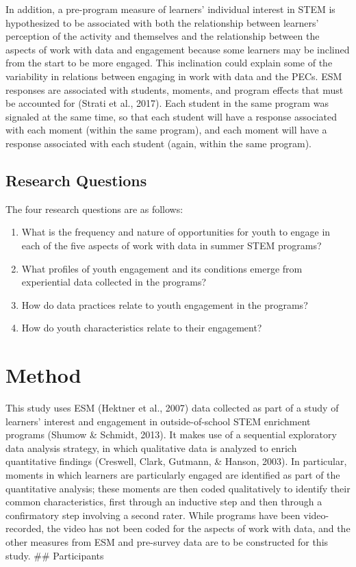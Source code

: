 \documentclass[]{msu-thesis}
\providecommand{\tightlist}{%
  \setlength{\itemsep}{0pt}\setlength{\parskip}{0pt}}
\theoremstyle{definition}
\theoremstyle{definition}
\theoremstyle{definition}
\theoremstyle{remark}
\begin{document}
In addition, a pre-program measure of learners' individual interest in
STEM is hypothesized to be associated with both the relationship between
learners' perception of the activity and themselves and the relationship
between the aspects of work with data and engagement because some
learners may be inclined from the start to be more engaged. This
inclination could explain some of the variability in relations between
engaging in work with data and the PECs. ESM responses are associated
with students, moments, and program effects that must be accounted for
(Strati et al., 2017). Each student in the same program was signaled at
the same time, so that each student will have a response associated with
each moment (within the same program), and each moment will have a
response associated with each student (again, within the same program).

\section{Research Questions}\label{research-questions}

The four research questions are as follows:

\begin{enumerate}
\def\labelenumi{\arabic{enumi}.}
\tightlist
\item
  What is the frequency and nature of opportunities for youth to engage
  in each of the five aspects of work with data in summer STEM programs?
\item
  What profiles of youth engagement and its conditions emerge from
  experiential data collected in the programs?
\item
  How do data practices relate to youth engagement in the programs?
\item
  How do youth characteristics relate to their engagement?
\end{enumerate}

\chapter{Method}\label{method}

This study uses ESM (Hektner et al., 2007) data collected as part of a
study of learners' interest and engagement in outside-of-school STEM
enrichment programs (Shumow \& Schmidt, 2013). It makes use of a
sequential exploratory data analysis strategy, in which qualitative data
is analyzed to enrich quantitative findings (Creswell, Clark, Gutmann,
\& Hanson, 2003). In particular, moments in which learners are
particularly engaged are identified as part of the quantitative
analysis; these moments are then coded qualitatively to identify their
common characteristics, first through an inductive step and then through
a confirmatory step involving a second rater. While programs have been
video-recorded, the video has not been coded for the aspects of work
with data, and the other measures from ESM and pre-survey data are to be
constructed for this study. \#\# Participants
\end{document}
